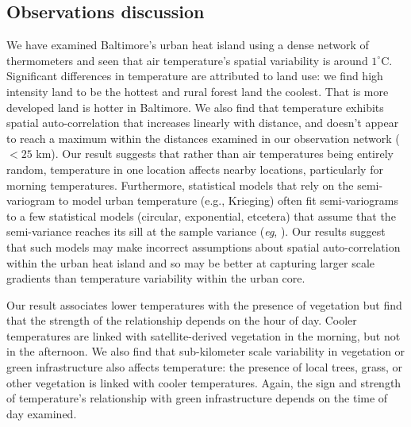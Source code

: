 \documentclass[draft,linenumbers]{agujournal}
\begin{document}
\subsection{Observations discussion}
We have examined Baltimore's urban heat island using a dense network of thermometers and seen that air temperature's spatial variability is around $1^\circ$C. Significant differences in temperature are attributed to land use: we find high intensity land to be the hottest and rural forest land the coolest. That is more developed land is hotter in Baltimore. We also find that temperature exhibits spatial auto-correlation that increases linearly with distance, and doesn't appear to reach a maximum within the distances examined in our observation network ($<25$ km). 
 Our result suggests that rather than air temperatures being entirely random, temperature in one location affects nearby locations, particularly for morning temperatures. Furthermore, statistical models that rely on the semi-variogram to model urban temperature (e.g., Krieging) often fit semi-variograms to a few statistical models (circular, exponential, etcetera) that assume that the semi-variance reaches its sill at the sample variance (\textit{eg}, \cite{hardin2017urban}). 
 Our results suggest that such models may make incorrect assumptions about spatial auto-correlation within the urban heat island and so may be better at capturing larger scale gradients than temperature variability within the urban core.
 
  

Our result associates lower temperatures with the presence of vegetation but find that the strength of the relationship depends on the hour of day. Cooler temperatures are linked with satellite-derived vegetation in the morning, but not in the afternoon.  We also find that sub-kilometer scale variability in vegetation or green infrastructure also affects temperature: the presence of local trees, grass, or other vegetation is linked with cooler temperatures. Again, the sign and strength of temperature's relationship with green infrastructure depends on the time of day examined. 
\end{document}
